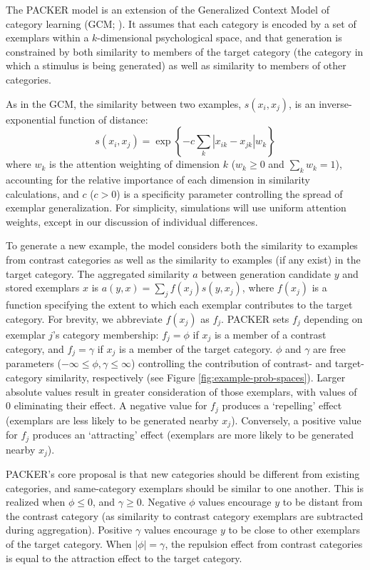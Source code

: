 \documentclass[10pt,letterpaper]{article}
\begin{document}
The PACKER model is an extension of the Generalized Context Model of category learning (GCM; \citealp{nosofsky1984choice}). It assumes that each category is encoded by a set of exemplars within a $k$-dimensional psychological space, and that generation is constrained by both similarity to members of the target category (the category in which a stimulus is being generated) as well as similarity to members of other categories. 

As in the GCM, the similarity between two examples, $s\left(x_i, x_j\right)$, is an inverse-exponential function of distance:
\begin{equation}
  s\left(x_i,x_j\right) = \exp \left\{ -c \sum_{k}{ \left| x_{ik} - x_{jk} \right|}w_k \right\}
  \label{eq:similarity}
\end{equation}
where $w_k$ is the attention weighting of dimension $k$ ($w_k \geq 0$ and $\sum_k{w_k} = 1$), accounting for the relative importance of each dimension in similarity calculations, and $c$ ($c>0$) is a specificity parameter controlling the spread of exemplar generalization. For simplicity, simulations will use uniform attention weights, except in our discussion of individual differences.  

To generate a new example, the model considers both the similarity to examples from contrast categories as well as the similarity to examples (if any exist) in the target category. The aggregated similarity $a$ between generation candidate $y$ and stored exemplars $x$ is $a(y, x) = \sum_j{f(x_j) s(y, x_j)}$, where $f(x_j)$ is a function specifying the extent to which each exemplar contributes to the target category. For brevity, we abbreviate $f(x_j)$ as $f_j$. PACKER sets $f_j$ depending on exemplar $j$'s category membership: $f_j = \phi$ if $x_j$ is a member of a contrast category, and $f_j = \gamma$ if $x_j$ is a member of the target category. $\phi$ and $\gamma$ are free parameters ($-\infty \leq \phi, \gamma \leq \infty$) controlling the contribution of contrast- and target-category similarity, respectively (see Figure \ref{fig:example-prob-spaces}). Larger absolute values result in greater consideration of those exemplars, with values of 0 eliminating their effect. A negative value for $f_j$ produces a `repelling' effect (exemplars are less likely to be generated nearby $x_j$). Conversely, a positive value for $f_j$ produces an `attracting' effect (exemplars are more likely to be generated nearby $x_j$). 

PACKER's core proposal is that new categories should be different from existing categories, and same-category exemplars should be similar to one another. This is realized when $\phi \leq 0$, and $\gamma \geq 0$. Negative $\phi$ values encourage $y$ to be distant from the contrast category (as similarity to contrast category exemplars are subtracted during aggregation). Positive $\gamma$ values encourage $y$ to be close to other exemplars of the target category. When $|\phi| = \gamma$, the repulsion effect from contrast categories is equal to the attraction effect to the target category.
\end{document}
